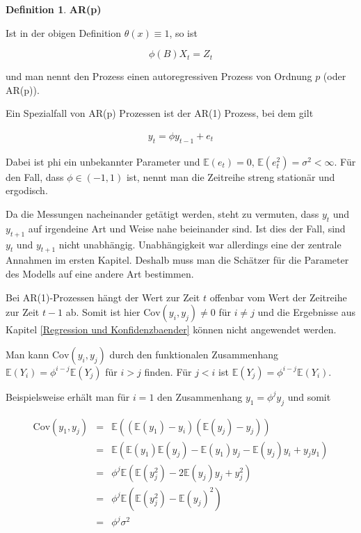 \documentclass[12pt,a4paper]{article}
\theoremstyle{definition}
\newtheorem{Definition}{Definition}[subsection]
\theoremstyle{definition}
\theoremstyle{definition}
\theoremstyle{definition}
\begin{document}
\begin{Definition}
\textbf{AR(p)}

Ist in der obigen Definition $\theta(x) \equiv 1$, so ist 

\begin{equation*}
\phi(B) X_t = Z_t
\end{equation*}

und man nennt den Prozess einen autoregressiven Prozess von Ordnung $p$ (oder AR(p)).
\end{Definition}

Ein Spezialfall von AR(p) Prozessen ist der AR(1) Prozess, bei dem gilt

\begin{align}
y_t = \phi y_{t-1} + e_t
\end{align}

Dabei ist \gls{phi} ein unbekannter Parameter und $\mathbb{E}(e_t)=0$, $\mathbb{E}(e_t^2)=\sigma^2 < \infty$. Für den Fall, dass $\phi \in (-1,1)$ ist, nennt man die Zeitreihe streng stationär und ergodisch. 

Da die Messungen nacheinander getätigt werden, steht zu vermuten, dass $y_t$ und $y_{t+1}$ auf irgendeine Art und Weise nahe beieinander sind. Ist dies der Fall, sind $y_t$ und $y_{t+1}$ nicht unabhängig. Unabhängigkeit war allerdings eine der zentrale Annahmen im ersten Kapitel. Deshalb muss man die Schätzer für die Parameter des Modells auf eine andere Art bestimmen.

Bei AR(1)-Prozessen hängt der Wert zur Zeit $t$ offenbar vom Wert der Zeitreihe zur Zeit $t-1$ ab. Somit ist hier $\text{Cov}(y_i,y_j) \neq 0$ für $i \neq j$ und die Ergebnisse aus Kapitel \ref{Regression und Konfidenzbaender} können nicht angewendet werden. 

Man kann $\text{Cov}(y_i,y_j)$ durch den funktionalen Zusammenhang $\mathbb{E}(Y_i) = \phi^{i-j} \mathbb{E}(Y_{j})$ für $i>j$ finden. Für $j<i$ ist $\mathbb{E}(Y_j) = \phi^{i-j} \mathbb{E}(Y_i)$. 

Beispielsweise erhält man für $i=1$ den Zusammenhang $y_1 = \phi^j y_j$ und somit

\begin{eqnarray*}
\text{Cov}(y_1, y_j) &=& \mathbb{E}((\mathbb{E}(y_1)-y_i)(\mathbb{E}(y_j)-y_j)) \\
&=& \mathbb{E}(\mathbb{E}(y_1)\mathbb{E}(y_j) - \mathbb{E}(y_1)y_j - \mathbb{E}(y_j)y_i +y_j y_1) \\
&=& \phi^j \mathbb{E}(\mathbb{E}(y_j^2) - 2 \mathbb{E}(y_j)y_j + y_j^2) \\
&=& \phi^j \mathbb{E}(\mathbb{E}(y_j^2)-\mathbb{E}(y_j)^2) \\
&=& \phi^j \sigma^2
\end{eqnarray*}
\end{document}
